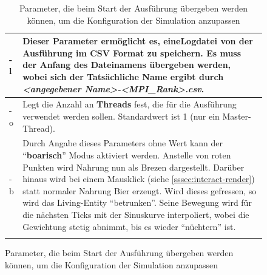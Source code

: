 \documentclass[course=erap]{aspdoc}
\begin{document}
\begin{figure}
\centering
\begin{longtable} {| p{2cm} | p{12cm} |}
\hline
-l & Dieser Parameter ermöglicht es, eine\textbf{Logdatei} von der Ausführung im CSV Format zu speichern.
Es muss der Anfang des Dateinamens übergeben werden, wobei sich der Tatsächliche Name ergibt durch \emph{<angegebener Name>-<MPI\_Rank>.csv}.\\
\hline
-o & Legt die Anzahl an \textbf{Threads} fest, die für die Ausführung verwendet werden sollen. Standardwert ist 1 (nur ein Master-Thread).\\
\hline
-b & Durch Angabe dieses Parameters ohne Wert kann der "`\textbf{boarisch}"' Modus aktiviert werden. Anstelle von roten Punkten wird Nahrung nun als Brezen dargestellt. Darüber hinaus wird bei einem Mausklick (siehe \ref{sssec:interact-render}) statt normaler Nahrung Bier erzeugt. Wird dieses gefressen, so wird das Living-Entity "`betrunken"'. Seine Bewegung wird für die nächsten Ticks mit der Sinuskurve interpoliert, wobei die Gewichtung stetig abnimmt, bis es wieder "`nüchtern"' ist.\\
\hline
\caption{Parameter, die beim Start der Ausführung übergeben werden können, um die Konfiguration der Simulation anzupassen}
\label{table:parameters}
\end{longtable}
\end{figure}
\end{document}
